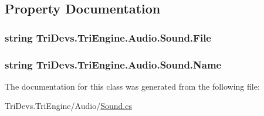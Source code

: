\subsection{Property Documentation}
\hypertarget{class_tri_devs_1_1_tri_engine_1_1_audio_1_1_sound_a9d93a5a33cc4b95cf40feb88343598e8}{
\subsubsection[{File}]{\setlength{\rightskip}{0pt plus 5cm}string Tri\-Devs.\-Tri\-Engine.\-Audio.\-Sound.\-File\hspace{0.3cm}{\ttfamily [get]}}}\label{class_tri_devs_1_1_tri_engine_1_1_audio_1_1_sound_a9d93a5a33cc4b95cf40feb88343598e8}
\hypertarget{class_tri_devs_1_1_tri_engine_1_1_audio_1_1_sound_a92880ad36c670d83d8f587cd5a4bfe12}{
\subsubsection[{Name}]{\setlength{\rightskip}{0pt plus 5cm}string Tri\-Devs.\-Tri\-Engine.\-Audio.\-Sound.\-Name\hspace{0.3cm}{\ttfamily [get]}}}\label{class_tri_devs_1_1_tri_engine_1_1_audio_1_1_sound_a92880ad36c670d83d8f587cd5a4bfe12}


The documentation for this class was generated from the following file\-:\begin{DoxyCompactItemize}
\item 
Tri\-Devs.\-Tri\-Engine/\-Audio/\hyperlink{_sound_8cs}{Sound.\-cs}\end{DoxyCompactItemize}
